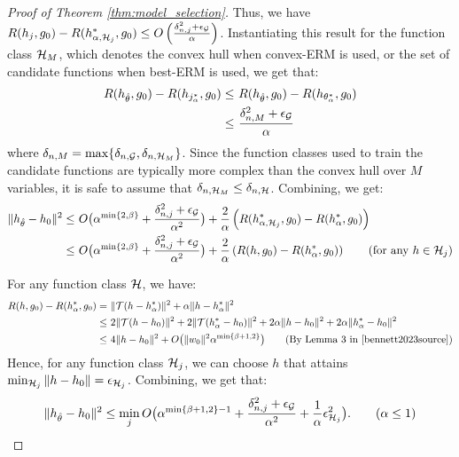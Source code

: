 \begin{proof}[Proof of Theorem \ref{thm:model_selection}]
Thus, we have $R(h_{j},g_0) -R(h_{\alpha,\mathcal{H}_{j}}^*,g_0) \leq O\left(\frac{\delta_{n,j}^2 + \epsilon_{\mathcal{G}}}{\alpha}\right)$. Instantiating this result for the function class $\mathcal{H}_M$, which denotes the convex hull when convex-ERM is used, or the set of candidate functions when best-ERM is used, we get that:
\begin{align*}
    R(h_{\hat{\theta}},g_0) - R(h_{j_{\alpha}^*},g_0) \leq ~& R(h_{\hat{\theta}},g_0) - R(h_{\theta_{\alpha}^*},g_0)\\
    \leq ~& \frac{\delta_{n,M}^2 + \epsilon_{\mathcal{G}}}{\alpha}
\end{align*} where $\delta_{n,M} = \max\{\delta_{n,\mathcal{G}}, \delta_{n,\mathcal{H}_M}\}$. Since the function classes used to train the candidate functions are typically more complex than the convex hull over $M$ variables, it is safe to assume that $\delta_{n,\mathcal{H}_M}\leq\delta_{n,\mathcal{H}}$.
Combining, we get:
\begin{align*}
    \|h_{\hat{\theta}} - h_0\|^2
    \leq ~& O\big(\alpha^{\min\{2,\beta\}} + \frac{\delta_{n,j}^2 + \epsilon_{\Gcal}}{\alpha^2}\big) 
    +\frac{2}{\alpha}\left(R(h_{\alpha, \Hcal_{j}}^*,g_0)-R(h_{\alpha}^*,g_0)\right)\\
    \leq ~& O\big(\alpha^{\min\{2,\beta\}} + \frac{\delta_{n,j}^2 + \epsilon_{\Gcal}}{\alpha^2}\big) + \frac{2}{\alpha}\left(R(h,g_0)-R(h_{\alpha}^*,g_0)\right) \tag{for any $h\in \Hcal_{j}$}\\ 
\end{align*} 

For any function class $\mathcal{H}$, we have:
\begin{align*}
    R(h,g_0)-R(h_{\alpha}^*,g_0) = ~& \|\Tcal(h-h_{\alpha}^*)\|^2 + \alpha \|h-h_{\alpha}^*\|^2\\
    \leq ~& 2\|\Tcal(h-h_0)\|^2 + 2\|\Tcal(h_{\alpha}^*-h_0)\|^2 + 2\alpha\|h-h_0\|^2 + 2\alpha \|h_{\alpha}^* - h_0\|^2\\
    \leq~& 4\|h-h_0\|^2 + O\big(\|w_0\|^2\alpha^{\min\{\beta+1,2\}}\big) \tag{By Lemma 3 in \cite{bennett2023source}}\\
\end{align*}
Hence, for any function class $\mathcal{H}_j$, we can choose $h$ that attains $\min_{\mathcal{H}_j}\|h-h_0\| = \epsilon_{\mathcal{H}_j}$. Combining, we get that: 
\begin{align*}
    \|h_{\hat{\theta}} - h_0\|^2 \leq \min_{j}O\big(\alpha^{\min\{\beta+1,2\}-1} + \frac{\delta_{n,j}^2 + \epsilon_{\mathcal{G}}}{\alpha^2} + \frac{1}{\alpha} \epsilon_{\mathcal{H}_j}^2\big). \tag{$\alpha \leq 1$}
\end{align*}


\end{proof}
